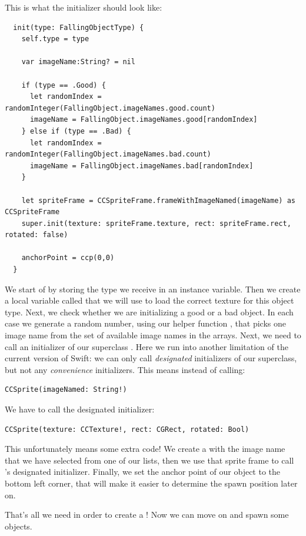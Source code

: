 This is what the initializer should look like:
\begin{lstlisting}
  init(type: FallingObjectType) {
    self.type = type
    
    var imageName:String? = nil
    
    if (type == .Good) {
      let randomIndex = randomInteger(FallingObject.imageNames.good.count)
      imageName = FallingObject.imageNames.good[randomIndex]
    } else if (type == .Bad) {
      let randomIndex = randomInteger(FallingObject.imageNames.bad.count)
      imageName = FallingObject.imageNames.bad[randomIndex]
    }
    
    let spriteFrame = CCSpriteFrame.frameWithImageNamed(imageName) as CCSpriteFrame
    super.init(texture: spriteFrame.texture, rect: spriteFrame.rect, rotated: false)
    
    anchorPoint = ccp(0,0)
  }
\end{lstlisting}
We start of by storing the type we receive in an instance variable.
Then we create a local variable called  that we will use
to load the correct texture for this object type. Next, we check whether we are
initializing a good or a bad object. In each case we generate a random number,
using our helper function , that picks one image name
from the set of available image names in the arrays. %
Next, we need to call an initializer of our superclass \ccsprite{}. Here we run
into another limitation of the current version of Swift: we can only call
\textit{designated} initializers of our superclass, but not any
\textit{convenience} initializers. This means instead of calling:
\begin{lstlisting}
CCSprite(imageNamed: String!)
\end{lstlisting}
We have to call the designated initializer:
\begin{lstlisting}
CCSprite(texture: CCTexture!, rect: CGRect, rotated: Bool)
\end{lstlisting}
This unfortunately means some extra code! We create a 
with the image name that we have selected from one of our lists, then we use
that sprite frame to call \ccsprite{}'s designated initializer. Finally, we set
the anchor point of our object to the bottom left corner, that will make it
easier to determine the spawn position later on.

That's all we need in order to create a ! Now we
can move on and spawn some objects.


